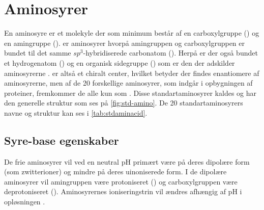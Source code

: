 \section{Aminosyrer}

En aminosyre er et molekyle der som minimum består af en carboxylgruppe () og en amingruppe ()\footnotemark{}.
 er aminosyrer hvorpå amingruppen og carboxylgruppen er bundet til det samme $sp^3$-hybridiserede carbonatom ().
Herpå er der også bundet et hydrogenatom () og en organisk sidegruppe () som er den der adskilder aminosyrerne \parencite{aminoBrit}.
 er altså et chiralt center,\footnotemark{} hvilket betyder der findes enantiomere af aminosyrerne, men af de 20 forskellige aminosyrer, som indgår i opbygningen af proteiner, fremkommer de alle kun som  \parencite{basisA}.
Disse standartaminosyrer kaldes  og har den generelle struktur som ses på \cref{fig:std-amino}.
De 20 standartaminosyrers navne og struktur kan ses i \cref{tab:stdaminacid}.

\subsection{Syre-base egenskaber}
De frie aminosyrer vil ved en neutral pH primært være på deres dipolære form (som zwitterioner) og mindre på deres uinoniserede form.
I de dipolære aminosyrer vil amingruppen være protoniseret () og carboxylgruppen være deprotoniseret ().
Aminosyrernes ioniseringstrin vil ændres afhængig af pH i opløsningen \parencite{aminoBrit,chemana}.
